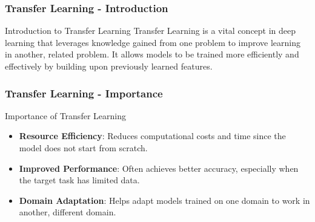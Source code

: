 \documentclass[aspectratio=169]{beamer}
\begin{document}
\begin{frame}[fragile]
    \frametitle{Transfer Learning - Introduction}
    \begin{block}{Introduction to Transfer Learning}
        Transfer Learning is a vital concept in deep learning that leverages knowledge gained from one problem to improve learning in another, related problem. It allows models to be trained more efficiently and effectively by building upon previously learned features.
    \end{block}
\end{frame}

\begin{frame}[fragile]
    \frametitle{Transfer Learning - Importance}
    \begin{block}{Importance of Transfer Learning}
        \begin{itemize}
            \item \textbf{Resource Efficiency}: Reduces computational costs and time since the model does not start from scratch.
            \item \textbf{Improved Performance}: Often achieves better accuracy, especially when the target task has limited data.
            \item \textbf{Domain Adaptation}: Helps adapt models trained on one domain to work in another, different domain.
        \end{itemize}
    \end{block}
\end{frame}
\end{document}
